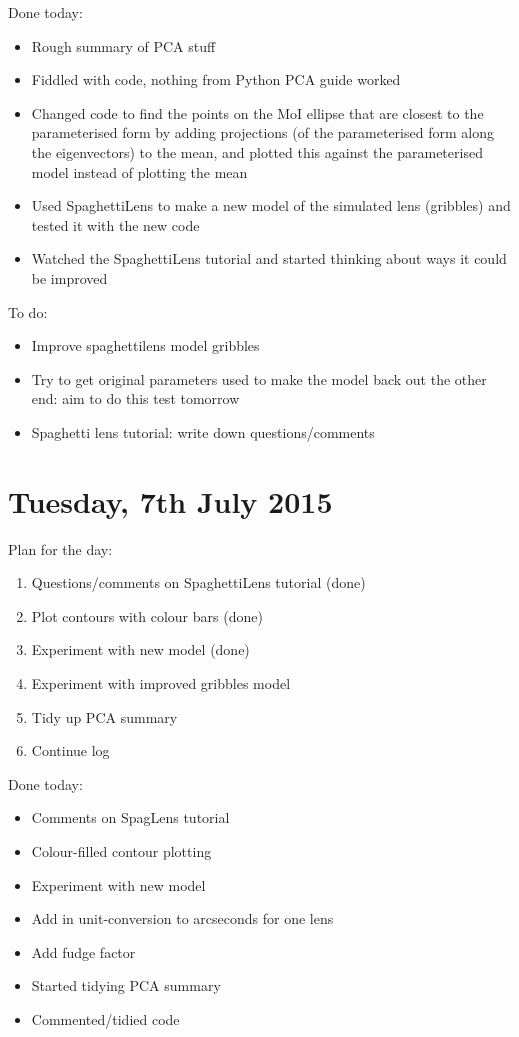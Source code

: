 \documentclass{article}
\begin{document}
\noindent Done today:
\begin{itemize}
  \item Rough summary of PCA stuff
  \item Fiddled with code, nothing from Python PCA guide worked
  \item Changed code to find the points on the MoI ellipse that are closest to the parameterised form by adding projections (of the parameterised form along the eigenvectors) to the mean, and plotted this against the parameterised model instead of plotting the mean
  \item Used SpaghettiLens to make a new model of the simulated lens (gribbles) and tested it with the new code
  \item Watched the SpaghettiLens tutorial and started thinking about ways it could be improved
\end{itemize}

\noindent To do:
\begin{itemize}
  \item Improve spaghettilens model gribbles
  \item Try to get original parameters used to make the model back out the other end: aim to do this test tomorrow
  \item Spaghetti lens tutorial: write down questions/comments
\end{itemize}\newpage

\section{Tuesday, 7th July 2015}
\noindent Plan for the day:
\begin{enumerate}
  \item Questions/comments on SpaghettiLens tutorial (done)
  \item Plot contours with colour bars (done)
  \item Experiment with new model (done)
  \item Experiment with improved gribbles model
  \item Tidy up PCA summary
  \item Continue log
\end{enumerate}

\noindent Done today:
\begin{itemize}
  \item Comments on SpagLens tutorial
  \item Colour-filled contour plotting
  \item Experiment with new model
  \item Add in unit-conversion to arcseconds for one lens
  \item Add fudge factor
  \item Started tidying PCA summary
  \item Commented/tidied code
\end{itemize}\newpage
\end{document}

